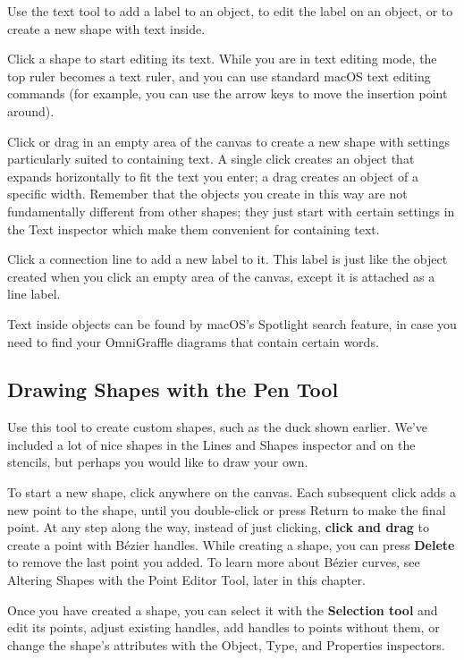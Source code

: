 \documentclass[../main.tex]{subfiles}
\begin{document}
Use the text tool to add a label to an object, to edit the label on an object, or to create a
new shape with text inside.


Click a shape to start editing its text. While you are in text editing mode, the top ruler
becomes a text ruler, and you can use standard macOS text editing commands (for example, you
can use the arrow keys to move the insertion point around).

Click or drag in an empty area of the canvas to create a new shape with settings particularly
suited to containing text. A single click creates an object that expands horizontally to fit
the text you enter; a drag creates an object of a specific width. Remember that the objects
you create in this way are not fundamentally different from other shapes; they just start with
certain settings in the Text inspector which make them convenient for containing text.

Click a connection line to add a new label to it. This label is just like the object created
when you click an empty area of the canvas, except it is attached as a line label.

Text inside objects can be found by macOS's Spotlight search feature, in case you need to find
your OmniGraffle diagrams that contain certain words.

\subsection{ Drawing Shapes with the Pen Tool}

Use this tool to create custom shapes, such as the duck shown earlier. We've included a lot of
nice shapes in the Lines and Shapes inspector and on the stencils, but perhaps you would like
to draw your own.

To start a new shape, click anywhere on the canvas. Each subsequent click adds a new point to
the shape, until you double-click or press Return to make the final point. At any step along
the way, instead of just clicking, \textbf{click and drag} to create a point with Bézier
handles. While creating a shape, you can press \textbf{Delete} to remove the last point you
added. To learn more about Bézier curves, see Altering Shapes with the Point Editor Tool,
later in this chapter.

Once you have created a shape, you can select it with the \textbf{Selection tool} and edit its
points, adjust existing handles, add handles to points without them, or change the shape's
attributes with the Object, Type, and Properties inspectors.
\end{document}
